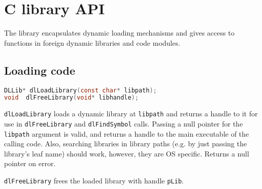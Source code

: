 %
%
%
%

\newpage
\section{ C library API}

The  library encapsulates dynamic loading mechanisms and
gives access to functions in foreign dynamic libraries and code modules.

\subsection{Loading code}

\begin{lstlisting}[language=c,label=dl-load]
DLLib* dlLoadLibrary(const char* libpath);
void  dlFreeLibrary(void* libhandle);
\end{lstlisting}

\lstinline{dlLoadLibrary} loads a dynamic library at \lstinline{libpath}
and returns a handle to it for use in \lstinline{dlFreeLibrary} and
\lstinline{dlFindSymbol} calls. Passing a null pointer for the \lstinline{libpath}
argument is valid, and returns a handle to the main executable of the calling code.
Also, searching libraries in library paths (e.g. by just passing the library's leaf
name) should work, however, they are OS specific. Returns a null pointer on error.

\lstinline{dlFreeLibrary} frees the loaded library with handle \lstinline{pLib}.

